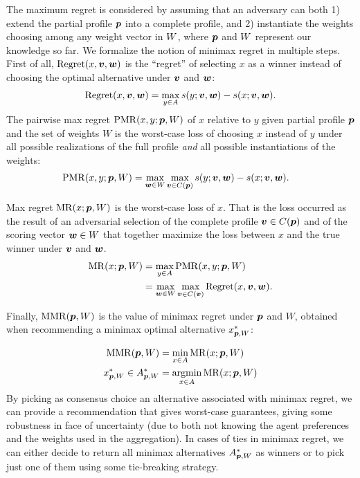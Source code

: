\documentclass[sigconf, anonymous]{aamas}
\begin{document}
The maximum regret is considered by assuming that an adversary can both 1) extend the partial profile ${\bm{p}}$ into a complete profile, and 2) instantiate the weights choosing among any weight vector in $W$, where ${\bm{p}}$ and $W$ represent our knowledge so far.
We formalize the notion of minimax regret in multiple steps.
First of all, $\operatorname{Regret}(x, \bm{v}, \bm{w})$ is the “regret” of selecting $x$ as a winner instead of choosing the optimal alternative under $\bm{v}$ and $\bm{w}$:
\begin{align} 
	\operatorname{Regret}(x, \bm{v}, \bm{w}) = \max_{y \in A} s(y; \bm{v},\bm{w}) - s(x; \bm{v}, \bm{w}).
\end{align}
The pairwise max regret $\operatorname{PMR}(x,y;{\bm{p}},W)$ of $x$ relative to $y$ given partial profile ${\bm{p}}$ and the set of weights $W$
is the worst-case loss of choosing $x$ instead of $y$ under all possible realizations of the full profile {\em and} all possible instantiations of the weights:
\begin{align}
	\operatorname{PMR}(x,y; {\bm{p}}, W) & = \max_{\bm{w} \in W} \max_{\bm{v} \in C({\bm{p}})} s(y; \bm{v},\bm{w}) - s(x; \bm{v},\bm{w}).
\end{align}

Max regret $\operatorname{MR}(x;{\bm{p}},W)$ is the worst-case loss of $x$. That is the loss occurred as the result of an adversarial selection of the complete profile $\bm{v} \in C({\bm{p}})$ and of the scoring vector $\bm{w} \in W$ that together maximize the loss between $x$ and the true winner under $\bm{v}$ and $\bm{w}$.
\begin{align}
	\operatorname{MR}(x; {\bm{p}}, W) & = \max_{y \in A} \operatorname{PMR}(x,y; {\bm{p}}, W)\\
	& = \max_{\bm{w} \in W} \max_{\bm{v} \in C(\bm{v})} \operatorname{Regret}(x, \bm{v}, \bm{w}).
\end{align}

Finally,  $\operatorname{MMR}({\bm{p}},W)$ is the value of minimax regret under ${\bm{p}}$ and $W$, obtained when recommending a minimax optimal alternative $x^*_{{\bm{p}}, W}$:

\begin{align}
	\operatorname{MMR}({\bm{p}},W) & = \min_{x \in A} \operatorname{MR}(x;{\bm{p}},W) \\
	x^{*}_{{\bm{p}},W} \in A^*_{{\bm{p}}, W} & = \operatorname*{argmin}_{x \in A} \operatorname{MR}(x;{\bm{p}},W)
\end{align}
By picking as consensus choice
an alternative associated with minimax regret, we can provide a recommendation that gives worst-case guarantees, giving some robustness in face of uncertainty (due to both not knowing the agent preferences and the weights used in the aggregation). 
In cases of ties in minimax regret, we can either decide to return all minimax alternatives $A^*_{{\bm{p}}, W}$ as winners or to pick just one of them using some tie-breaking strategy.
\end{document}
